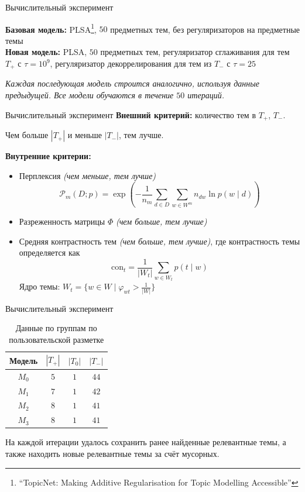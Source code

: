 \documentclass{beamer}
\begin{document}
\begin{frame}{Вычислительный эксперимент}

\textbf{Базовая модель:} PLSA\footnote{“TopicNet: Making Additive Regularisation for
Topic Modelling Accessible”}, $50$ предметных тем, без регуляризаторов на предметные темы \\
\textbf{Новая модель:} PLSA, $50$ предметных тем, регуляризатор сглаживания для тем $T_+$ с $\tau = {10}^{9}$, регуляризатор декоррелирования для тем из $T_-$ с $\tau = 25$

{\footnotesize \textit{Каждая последующая модель строится аналогично, используя данные предыдущей. Все модели обучаются в течение $50$ итераций.}}

\end{frame}

\begin{frame}{Вычислительный эксперимент}
    \textbf{Внешний критерий:} количество тем в $T_+$,  $T_-$.
    
    {\footnotesize Чем больше $|T_+|$ и меньше $|T_-|$, тем лучше.}

    \textbf{Внутренние критерии:}

    \begin{itemize}
        \item Перплексия \textit{(чем меньше, тем лучше)}
        $$\mathcal{P}_m (D; p) = \exp \left( - \frac{1}{n_m} \sum \limits_{d \in D} \sum \limits_{w \in W^m} n_{dw} \ln p (w \mid d) \right)$$
        \item Разреженность матрицы $\Phi$ \textit{(чем больше, тем лучше)}
        \item Средняя контрастность тем \textit{(чем больше, тем лучше)}, где контрастность темы определяется как
        $$\text{con}_t = \frac{1}{|W_t|} \sum \limits_{w \in W_t} p(t \mid w)$$
        Ядро темы: $W_t = \{ w \in W \mid \varphi_{wt} > \frac{1}{|W|} \}$
    \end{itemize}
\end{frame}

\begin{frame}{Вычислительный эксперимент}

    \begin{table}[]
        \centering
        \begin{tabular}{c|c|c|c|}
            Модель & $|T_+|$ & $|T_0|$ & $|T_-|$ \\
            \hline
            $M_0$ & $5$ & $1$ & $44$ \\
            $M_1$ & $7$ & $1$ & $42$ \\
            $M_2$ & $8$ & $1$ & $41$ \\
            $M_3$ & $8$ & $1$ & $41$
        \end{tabular}
        \caption{Данные по группам по пользовательской разметке}
        \label{tab:my_label}
    \end{table}

    На каждой итерации удалось сохранить ранее найденные релевантные темы, а также находить новые релевантные темы за счёт мусорных.

\end{frame}
\end{document}
